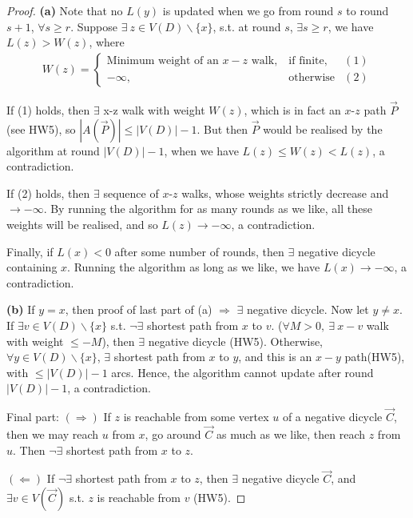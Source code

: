 \begin{proof}
    \textbf{(a)} Note that no $L(y)$ is updated when we go from round $s$ to round $s+1$, $\forall s\geqslant r$. Suppose $\exists\ z\in V(D)\backslash\{x\}$, s.t. at round $s$, $\exists s\geqslant r$, we have $L(z)>W(z)$, where 
    \begin{align*}
        W(z) = \left\lbrace\begin{array}{ccc}
            \textrm{Minimum weight of an }x-z \textrm{ walk,} &\  \textrm{if finite}, & (1) \\
            -\infty, & \ \textrm{otherwise} & (2)
        \end{array} \right.
    \end{align*}

    If (1) holds, then $\exists$ x-z walk with weight $W(z)$, which is in fact an $x$-$z$ path $\vec{P}$ (see HW5), so $|A(\vec{P})| \leqslant |V(D)| - 1$. But then $\vec{P}$ would be realised by the algorithm at round $|V(D)| - 1$, when we have $L(z)\leqslant W(z) < L(z)$, a contradiction. 

    If (2) holds, then $\exists$ sequence of $x$-$z$ walks, whose weights strictly decrease and $\to - \infty$. By running the algorithm for as many rounds as we like, all these weights will be realised, and so $L(z)\to -\infty$, a contradiction.

    Finally, if $L(x)<0$ after some number of rounds, then $\exists$ negative dicycle containing $x$. Running the algorithm as long as we like, we have $L(x)\to -\infty$, a contradiction.

    \textbf{(b)} If $y=x$, then proof of last part of (a) $\Longrightarrow$ $\exists$ negative dicycle. Now let $y\neq x$. If $\exists v\in V(D)\backslash \{x\}$ s.t. $\neg\exists$ shortest path from $x$ to $v$. ($\forall M>0,\ \exists\ x-v $ walk with weight $\leqslant -M$), then $\exists$ negative dicycle (HW5). Otherwise, $\forall y\in V(D)\backslash\{x\}$, $\exists$ shortest path from $x$ to $y$, and this is an $x-y$ path(HW5), with $\leqslant |V(D)| - 1$ arcs. Hence, the algorithm cannot update after round $|V(D)| - 1$, a contradiction.

    Final part: $(\Longrightarrow)$ If $z$ is reachable from some vertex $u$ of a negative dicycle $\vec{C}$, then we may reach $u$ from $x$, go around $\vec{C}$ as much as we like, then reach $z$ from $u$. Then $\neg\exists$ shortest path from $x$ to $z$.

    $(\Longleftarrow)$ If $\neg\exists$ shortest path from $x$ to $z$, then $\exists$ negative dicycle $\vec{C}$, and $\exists v\in V(\vec{C})$ s.t. $z$ is reachable from $v$ (HW5).
\end{proof}

